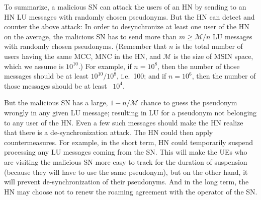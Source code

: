 \documentclass{llncs} %
\begin{document}
To summarize, a malicious SN can attack the users of an HN by sending to an HN LU messages with randomly chosen pseudonyms. But the HN can detect and counter the above attack: In order to desynchronize at least one user of the HN on the average, the malicious SN has to send more than $m \geq \mathcal{M}/n$  LU messages with randomly chosen pseudonyms. (Remember that $n$ is the total number of users having the same MCC, MNC in the HN, and $\mathcal{M}$ is the size of MSIN space, which we assume is $10^{10}$.) For example, if $n=10^8$, then the number of those messages should be at least $10^{10}/10^{8}$, i.e.~100; and if $n=10^6$, then the number of those messages should be at least ~$10^4.$
 
But the malicious SN has a large, $1 - n/\mathcal{M}$ chance to guess the pseudonym wrongly in any given LU message; resulting in LU for a pseudonym not belonging to any user of the HN. Even a few such messages should make the HN realize that there is a de-synchronization attack. The HN could then apply countermeasures. For example, in the short term, HN could temporarily suspend processing any LU messages coming from the SN. This will make the UEs who are visiting the malicious SN more easy to track for the duration of suspension (because they will have to use the same pseudonym), but on the other hand, it will prevent de-synchronization of their pseudonyms. And in the long term, the HN may choose not to renew the roaming agreement with the operator of the SN.


\end{document}
